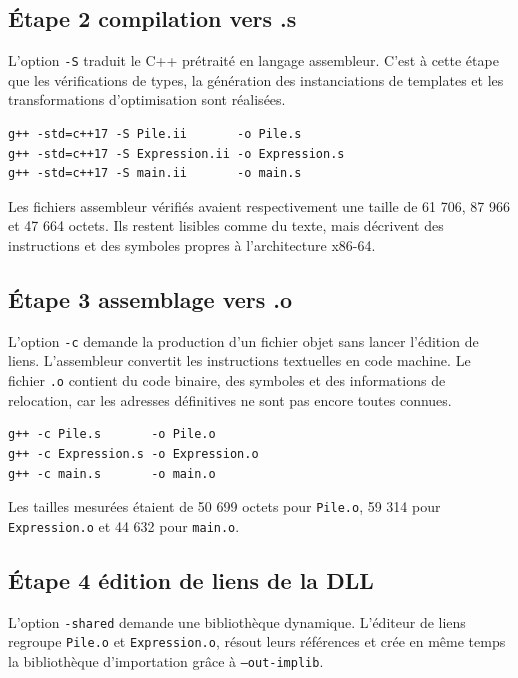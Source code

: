 \documentclass[11pt,a4paper]{article}
\newcommand{\fichier}[1]{\texttt{#1}}
\begin{document}
\subsection{Étape 2 compilation vers .s}

L'option \texttt{-S} traduit le C++ prétraité en langage assembleur. C'est à cette étape que les vérifications de types, la génération des instanciations de templates et les transformations d'optimisation sont réalisées.

\begin{lstlisting}[style=console,caption={Génération de l'assembleur}]
g++ -std=c++17 -S Pile.ii       -o Pile.s
g++ -std=c++17 -S Expression.ii -o Expression.s
g++ -std=c++17 -S main.ii       -o main.s
\end{lstlisting}

Les fichiers assembleur vérifiés avaient respectivement une taille de 61 706, 87 966 et 47 664 octets. Ils restent lisibles comme du texte, mais décrivent des instructions et des symboles propres à l'architecture x86-64.

\subsection{Étape 3 assemblage vers .o}

L'option \texttt{-c} demande la production d'un fichier objet sans lancer l'édition de liens. L'assembleur convertit les instructions textuelles en code machine. Le fichier \fichier{.o} contient du code binaire, des symboles et des informations de relocation, car les adresses définitives ne sont pas encore toutes connues.

\begin{lstlisting}[style=console,caption={Production des objets}]
g++ -c Pile.s       -o Pile.o
g++ -c Expression.s -o Expression.o
g++ -c main.s       -o main.o
\end{lstlisting}

Les tailles mesurées étaient de 50 699 octets pour \fichier{Pile.o}, 59 314 pour \fichier{Expression.o} et 44 632 pour \fichier{main.o}.

\subsection{Étape 4 édition de liens de la DLL}

L'option \texttt{-shared} demande une bibliothèque dynamique. L'éditeur de liens regroupe \fichier{Pile.o} et \fichier{Expression.o}, résout leurs références et crée en même temps la bibliothèque d'importation grâce à \texttt{--out-implib}.
\end{document}
